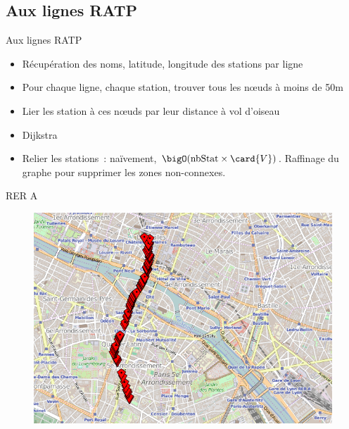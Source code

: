 \documentclass[11pt]{beamer}
\begin{document}
\subsection{Aux lignes RATP}

\begin{frame}{Aux lignes RATP}
\begin{itemize}
\item Récupération des noms, latitude, longitude des stations par ligne
\item Pour chaque ligne, chaque station, trouver tous les nœuds à moins de 50m
\item Lier les station à ces nœuds par leur distance à vol d'oiseau
\item Dijkstra
\item Relier les stations~: naïvement, $\bigO(\text{nbStat} \times \card{V})$. Raffinage du graphe pour supprimer les zones non-connexes.
\end{itemize}
\end{frame}

\begin{frame}{RER A}
\begin{figure}
\includegraphics[width=0.9\linewidth]{mapToRerA.png}
\end{figure}
\end{frame}
\end{document}
